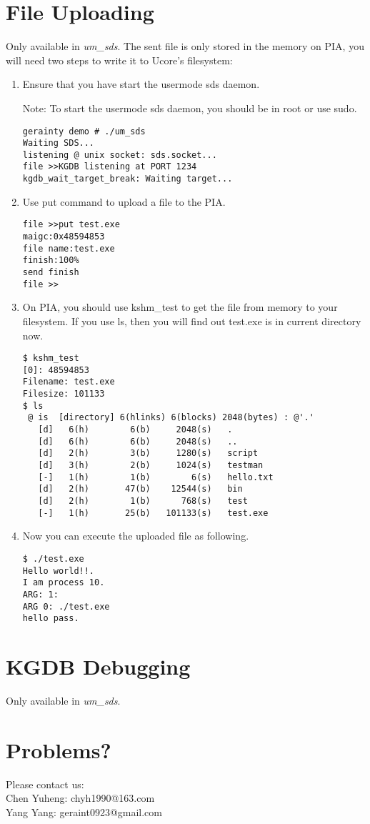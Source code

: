 \documentclass[a4paper]{article}
\begin{document}
\section{File Uploading}
Only available in \emph{um\_sds}. The sent file is only stored
in the memory on PIA, you will need two steps to write it to
Ucore's filesystem:
\begin{enumerate}
\item Ensure that you have start the usermode sds daemon.

Note: To start the usermode sds daemon, you should be in root or use sudo.
\begin{verbatim}
gerainty demo # ./um_sds 
Waiting SDS...
listening @ unix socket: sds.socket...
file >>KGDB listening at PORT 1234
kgdb_wait_target_break: Waiting target...
\end{verbatim}

\item Use put command to upload a file to the PIA.
\begin{verbatim}
file >>put test.exe
maigc:0x48594853
file name:test.exe
finish:100%
send finish
file >>
\end{verbatim}


\item On PIA, you should use kshm\_test to get the file from memory to your filesystem. If you use ls, then you will find out test.exe is in current directory now.
\begin{verbatim}
$ kshm_test
[0]: 48594853
Filename: test.exe
Filesize: 101133
$ ls 
 @ is  [directory] 6(hlinks) 6(blocks) 2048(bytes) : @'.'
   [d]   6(h)        6(b)     2048(s)   .
   [d]   6(h)        6(b)     2048(s)   ..
   [d]   2(h)        3(b)     1280(s)   script
   [d]   3(h)        2(b)     1024(s)   testman
   [-]   1(h)        1(b)        6(s)   hello.txt
   [d]   2(h)       47(b)    12544(s)   bin
   [d]   2(h)        1(b)      768(s)   test
   [-]   1(h)       25(b)   101133(s)   test.exe

\end{verbatim}

\item Now you can execute the uploaded file as following.
\begin{verbatim}
$ ./test.exe
Hello world!!.
I am process 10.
ARG: 1:
ARG 0: ./test.exe
hello pass.
\end{verbatim}
\end{enumerate}

\section{KGDB Debugging}
Only available in \emph{um\_sds}. 

\section{Problems?}
Please contact us: \\
Chen Yuheng: chyh1990@163.com\\
Yang Yang: geraint0923@gmail.com
\end{document}
